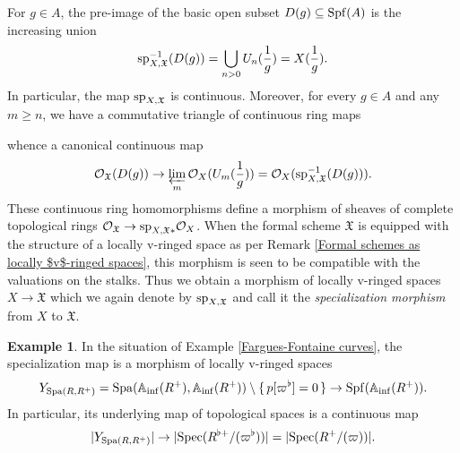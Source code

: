 \documentclass[12pt,twoside,a4paper]{article}
\theoremstyle{definition}
\newtheorem{example}[thm]{Example}
\theoremstyle{remark}
\newcommand\spc{{\rm sp}}
\newcommand\Spa{{\rm Spa}}
\newcommand\Spec{{\rm Spec}}
\newcommand\Spf{{\rm Spf}}
\begin{document}
For $g\in A$, the pre-image of the basic open subset $D(g)\subseteq \Spf(A)$ is the increasing union \begin{equation*}\spc_{X,\mathfrak{X}}^{-1}(D(g))=\bigcup_{n>0}U_{n}(\frac{1}{g})=X(\frac{1}{g}).\end{equation*}In particular, the map $\spc_{X,\mathfrak{X}}$ is continuous. Moreover, for every $g\in A$ and any $m\geq n$, we have a commutative triangle of continuous ring maps \begin{center}\end{center}whence a canonical continuous map \begin{equation*}\mathcal{O}_{\mathfrak{X}}(D(g))\to \varprojlim_{m}\mathcal{O}_{X}(U_{m}(\frac{1}{g}))=\mathcal{O}_{X}(\spc_{X,\mathfrak{X}}^{-1}(D(g))).\end{equation*}These continuous ring homomorphisms define a morphism of sheaves of complete topological rings $\mathcal{O}_{\mathfrak{X}}\to \spc_{X,\mathfrak{X}\ast}\mathcal{O}_{X}$. When the formal scheme $\mathfrak{X}$ is equipped with the structure of a locally v-ringed space as per Remark \ref{Formal schemes as locally $v$-ringed spaces}, this morphism is seen to be compatible with the valuations on the stalks. Thus we obtain a morphism of locally v-ringed spaces $X\to\mathfrak{X}$ which we again denote by $\spc_{X,\mathfrak{X}}$ and call it the \textit{specialization morphism} from $X$ to $\mathfrak{X}$.
\begin{example}In the situation of Example \ref{Fargues-Fontaine curves}, the specialization map is a morphism of locally v-ringed spaces \begin{equation*}Y_{\Spa(R, R^{+})}=\Spa(\mathbb{A}_{\inf}(R^{+}), \mathbb{A}_{\inf}(R^{+}))\setminus\{\, p[\varpi^{\flat}]=0\,\}\to \Spf(\mathbb{A}_{\inf}(R^{+})).\end{equation*}In particular, its underlying map of topological spaces is a continuous map \begin{equation*}\vert Y_{\Spa(R, R^{+})}\vert\to \vert \Spec(R^{\flat+}/(\varpi^{\flat}))\vert=\vert\Spec(R^{+}/(\varpi))\vert.\end{equation*}\end{example}
\end{document}

